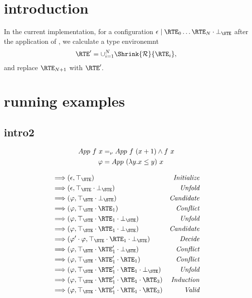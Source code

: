 \documentclass[acmsmall,review,anonymous]{acmart}\settopmatter{printfolios=true,printccs=false,printacmref=false}
\begin{document}
\section{introduction}

In the current implementation, for a configuration \( \epsilon \mid \RTE_0 \dots
\RTE_N \cdot \bot_{\STE} \) after the application of \runfold{}, we calculate
a type environemnt
\begin{align*}
    \RTE' = \cup_{i=1}^N \Shrink{\RULES}{\RTE_i},
\end{align*}
and replace \( \RTE_{N+1} \) with \( \RTE' \).

\section{running examples}
\subsection{intro2}

\begin{align*}
    App\ f\ x &=_{\nu} App\ f\ (x+1) \land f\ x\\
    \varphi &= App\ (\lambda y. x \leq y)\ x
\end{align*}

\begin{align*}
  & \Tr (\epsilon, \TE{\STE}) &\rinitialize \\
  & \Tr (\epsilon, \TE{\STE}\cdot \BE{\STE}) & \runfold \\
  & \Tr (\pdrtop, \TE{\STE}\cdot \BE{\STE}) & \rcandidate \\
    & \Tr (\pdrtop, \TE{\STE}\cdot \RTE_1) & \rconflict \\
    & \Tr (\pdrtop, \TE{\STE}\cdot \RTE_1 \cdot \BE{\STE} ) & \runfold \\
  & \Tr (\pdrtop, \TE{\STE}\cdot \RTE_1 \cdot \BE{\STE}) & \rcandidate \\
    & \Tr (\pdrtop' \cdot \pdrtop, \TE{\STE}\cdot \RTE_1 \cdot \BE{\STE}) & \rdecide \\
    & \Tr (\pdrtop, \TE{\STE} \cdot \RTE_1' \cdot \BE{\STE}) & \rconflict \\
    & \Tr (\pdrtop, \TE{\STE} \cdot \RTE_1' \cdot \RTE_1) & \rconflict \\
    & \Tr (\pdrtop, \TE{\STE} \cdot \RTE_1' \cdot \RTE_1 \cdot \BE{\STE}) & \runfold \\
    & \Tr (\pdrtop, \TE{\STE} \cdot \RTE_1' \cdot \RTE_1 \cdot \RTE_3) &
    \rinduction \\
    & \Tr (\pdrtop, \TE{\STE} \cdot \RTE_1' \cdot \RTE_1 \cdot \RTE_3) &
    \rvalid
\end{align*}
\end{document}
